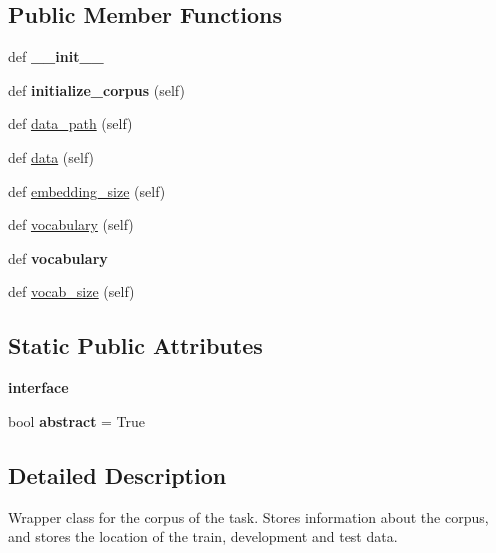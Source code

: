 \subsection*{Public Member Functions}
\begin{DoxyCompactItemize}
\item 
def {\bfseries \+\_\+\+\_\+init\+\_\+\+\_\+}\hypertarget{classreader_1_1Corpora_a9ad3ac921ea96dc7f8fa8bf7c7ff229e}{}\label{classreader_1_1Corpora_a9ad3ac921ea96dc7f8fa8bf7c7ff229e}

\item 
def {\bfseries initialize\+\_\+corpus} (self)\hypertarget{classreader_1_1Corpora_aefb3138ee5f779ce6d2c59bcfd6c2036}{}\label{classreader_1_1Corpora_aefb3138ee5f779ce6d2c59bcfd6c2036}

\item 
def \hyperlink{classreader_1_1Corpora_a2337b5a9f4ccb22319efe53c30eb64e5}{data\+\_\+path} (self)
\item 
def \hyperlink{classreader_1_1Corpora_ac9b97eca41b10d9644578f08331cb3aa}{data} (self)
\item 
def \hyperlink{classreader_1_1Corpora_a6860dfc0d9e0fcec9845f5547b2d6d4b}{embedding\+\_\+size} (self)
\item 
def \hyperlink{classreader_1_1Corpora_ab529f2e09355eacb9738bbeae9db25fb}{vocabulary} (self)
\item 
def {\bfseries vocabulary}\hypertarget{classreader_1_1Corpora_a0ab2f224865fe520d4d34d57d1ea2da7}{}\label{classreader_1_1Corpora_a0ab2f224865fe520d4d34d57d1ea2da7}

\item 
def \hyperlink{classreader_1_1Corpora_a66ac789d61b871ea4bcd0986417a9f46}{vocab\+\_\+size} (self)
\end{DoxyCompactItemize}
\subsection*{Static Public Attributes}
\begin{DoxyCompactItemize}
\item 
{\bfseries interface}
\item 
bool {\bfseries abstract} = True\hypertarget{classreader_1_1Corpora_a6f0b71be41f76098f37d0601052fc236}{}\label{classreader_1_1Corpora_a6f0b71be41f76098f37d0601052fc236}

\end{DoxyCompactItemize}


\subsection{Detailed Description}
\begin{DoxyVerb}Wrapper class for the corpus of the task. Stores information about the corpus, and
stores the location of the train, development and test data.
\end{DoxyVerb}
 

